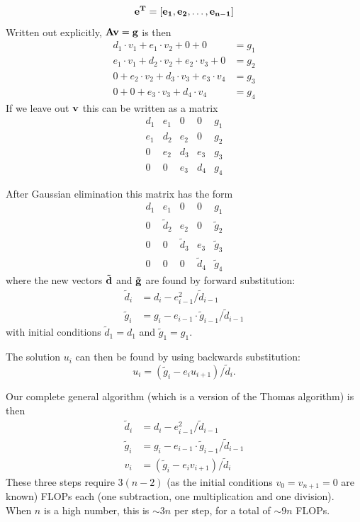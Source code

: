 \documentclass[english, nofootinbib]{revtex4-1}  %
\begin{document}
\begin{equation}
\bf{e}^T = [e_1, e_2, \dots, e_{n-1}]
\end{equation}
Written out explicitly, $\bf{Av} = \bf{g}$ is then
\begin{equation}
\begin{aligned}
d_1\cdot v_1 + e_1\cdot v_2 + 0 + 0 &= g_1\\
e_1\cdot v_1 + d_2\cdot v_2 + e_2\cdot v_3 + 0 &= g_2\\
0 + e_2\cdot v_2 + d_3\cdot v_3 + e_3 \cdot v_4 &= g_3\\
0 + 0 + e_3\cdot v_3 + d_4 \cdot v_4 &= g_4
\end{aligned}
\end{equation}
If we leave out $\bf{v}$ this can be written as a matrix
$$
\begin{matrix}
d_1 & e_1 & 0 & 0 & g_1\\
e_1 & d_2 & e_2 & 0 & g_2\\
0 & e_2 & d_3 & e_3 & g_3\\
0 & 0 & e_3 & d_4 & g_4
\end{matrix}
$$

After Gaussian elimination this matrix has the form
$$
\begin{matrix}
d_1 & e_1 & 0 & 0 & g_1\\
0 & \tilde{d}_2 & e_2 & 0 & \tilde{g}_2\\
0 & 0 & \tilde{d}_3 & e_3 & \tilde{g}_3\\
0 & 0 & 0 & \tilde{d}_4 & \tilde{g}_4
\end{matrix}
$$
where the new vectors $\bf{\tilde{d}}$ and $\bf{\tilde{g}}$ are found by forward substitution:
\begin{equation} 
\begin{aligned}
\tilde{d}_i &= d_i - e_{i-1}^2/\tilde{d}_{i-1}\\
\tilde{g}_i &= g_i - e_{i-1}\cdot \tilde{g}_{i-1}/\tilde{d}_{i-1}
\end{aligned}
\end{equation}
with initial conditions $\tilde{d}_1 = d_1$ and $\tilde{g}_1 = g_1$.

The solution $u_i$ can then be found by using backwards substitution:
\begin{equation}
u_i = (\tilde{g}_i - e_i u_{i+1})/\tilde{d}_i.
\end{equation}

Our complete general algorithm (which is a version of the Thomas algorithm) is then
\begin{equation} 
\begin{aligned}
\tilde{d}_i &= d_i - e_{i-1}^2/\tilde{d}_{i-1}\\
\tilde{g}_i &= g_i - e_{i-1}\cdot \tilde{g}_{i-1}/\tilde{d}_{i-1}\\
v_i &= (\tilde{g}_i - e_i v_{i+1})/\tilde{d}_i
\end{aligned}
\end{equation}
These three steps require $3(n-2)$ (as the initial conditions $v_0 = v_{n+1} = 0$ are known) FLOPs each (one subtraction, one multiplication and one division). When $n$ is a high number, this is $\sim 3n$ per step, for a total of $\sim 9n$ FLOPs.\\
\end{document}
